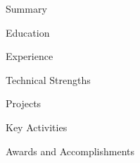 \documentclass{resume}
\begin{document}

\begin{rSection}{Summary}

\end{rSection}


\begin{rSection}{Education}

\end{rSection}


\begin{rSection}{Experience}

\end{rSection}


\begin{rSection}{Technical Strengths}

\end{rSection}


\begin{rSection}{Projects}

\end{rSection}


\begin{rSection}{Key Activities}

\end{rSection}


\begin{rSection}{Awards and Accomplishments}

\end{rSection}
\end{document}
